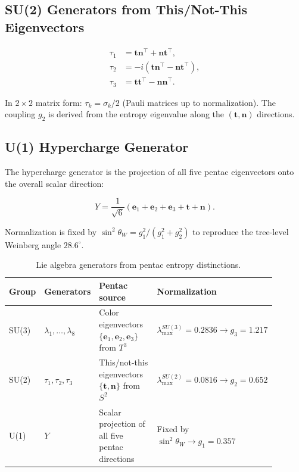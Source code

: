 \documentclass[11pt]{article}
\begin{document}
\subsection{SU(2) Generators from This/Not-This Eigenvectors}

\begin{align}
  \tau_1 &= \mathbf{t}\mathbf{n}^\top
             + \mathbf{n}\mathbf{t}^\top, \\
  \tau_2 &= -i(\mathbf{t}\mathbf{n}^\top
             - \mathbf{n}\mathbf{t}^\top), \\
  \tau_3 &= \mathbf{t}\mathbf{t}^\top
             - \mathbf{n}\mathbf{n}^\top.
\end{align}

In $2\times2$ matrix form: $\tau_k = \sigma_k/2$ (Pauli matrices
up to normalization). The coupling $g_2$ is derived from the
entropy eigenvalue along the $(\mathbf{t},\mathbf{n})$ directions.

\subsection{U(1) Hypercharge Generator}

The hypercharge generator is the projection of all five
pentac eigenvectors onto the overall scalar direction:

\begin{equation}
  Y = \frac{1}{\sqrt{6}}
      (\mathbf{e}_1 + \mathbf{e}_2 + \mathbf{e}_3
       + \mathbf{t} + \mathbf{n}).
\end{equation}

Normalization is fixed by $\sin^2\theta_W=g_1^2/(g_1^2+g_2^2)$
to reproduce the tree-level Weinberg angle $28.6^\circ$.

\begin{table}[htbp]
\centering
\caption{Lie algebra generators from pentac entropy distinctions.}
\label{tab:generators}
\begin{tabular}{@{}p{0.12\linewidth}p{0.16\linewidth}p{0.26\linewidth}p{0.35\linewidth}@{}}
\toprule
Group & Generators & Pentac source & Normalization \\
\midrule
SU(3) & $\lambda_1,\ldots,\lambda_8$
  & Color eigenvectors $\{\mathbf{e}_1,\mathbf{e}_2,\mathbf{e}_3\}$
    from $T^3$
  & $\lambda_\text{max}^{SU(3)}=0.2836\to g_3=1.217$ \\[6pt]
SU(2) & $\tau_1,\tau_2,\tau_3$
  & This/not-this eigenvectors $\{\mathbf{t},\mathbf{n}\}$
    from $S^2$
  & $\lambda_\text{max}^{SU(2)}=0.0816\to g_2=0.652$ \\[6pt]
U(1)  & $Y$
  & Scalar projection of all five pentac directions
  & Fixed by $\sin^2\theta_W\to g_1=0.357$ \\
\bottomrule
\end{tabular}
\end{table}
\end{document}
